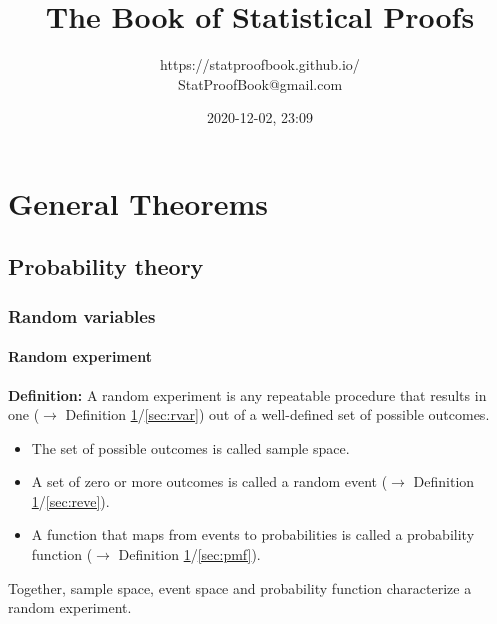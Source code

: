 \documentclass[a4paper,12pt,twoside]{book}
\title{\Huge{The Book of Statistical Proofs}}
\author{https://statproofbook.github.io/ \\ StatProofBook@gmail.com}
\date{2020-12-02, 23:09}
\begin{document}
\maketitle

\pagebreak
{}
\tableofcontents

\newpage
{}


\chapter{General Theorems} \label{sec:General Theorems} \newpage

\pagebreak
\section{Probability theory}

\subsection{Random variables}

\subsubsection[\textit{Random experiment}]{Random experiment} \label{sec:rexp}
\setcounter{equation}{0}

\textbf{Definition:} A random experiment is any repeatable procedure that results in one ($\rightarrow$ Definition \ref{sec:General Theorems}/\ref{sec:rvar}) out of a well-defined set of possible outcomes.

\begin{itemize}

\item The set of possible outcomes is called sample space.

\item A set of zero or more outcomes is called a random event ($\rightarrow$ Definition \ref{sec:General Theorems}/\ref{sec:reve}).

\item A function that maps from events to probabilities is called a probability function ($\rightarrow$ Definition \ref{sec:General Theorems}/\ref{sec:pmf}).

\end{itemize}

Together, sample space, event space and probability function characterize a random experiment.
\end{document}
